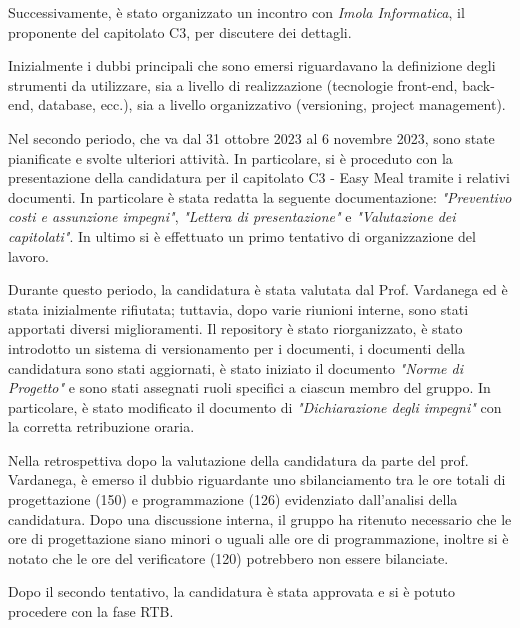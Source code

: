 Successivamente, è stato organizzato un incontro con \emph{Imola Informatica}, il proponente del capitolato C3, per discutere dei dettagli.

Inizialmente i dubbi principali che sono emersi riguardavano la definizione degli strumenti da utilizzare, sia a livello di realizzazione (tecnologie front-end, back-end, database, ecc.), sia a livello organizzativo (versioning, project management).

Nel secondo periodo, che va dal 31 ottobre 2023 al 6 novembre 2023, sono state pianificate e svolte ulteriori attività. In particolare, si è proceduto con la presentazione della candidatura per il capitolato C3 - Easy Meal tramite i relativi documenti. In particolare è stata redatta la seguente documentazione: \emph{"Preventivo costi e assunzione impegni"}, \emph{"Lettera di presentazione"} e \emph{"Valutazione dei capitolati"}. In ultimo si è effettuato un primo tentativo di organizzazione del lavoro.

Durante questo periodo, la candidatura è stata valutata dal Prof. Vardanega ed è stata inizialmente rifiutata; tuttavia, dopo varie riunioni interne, sono stati apportati diversi miglioramenti. Il repository è stato riorganizzato, è stato introdotto un sistema di versionamento per i documenti, i documenti della candidatura sono stati aggiornati, è stato iniziato il documento \emph{"Norme di Progetto"} e sono stati assegnati ruoli specifici a ciascun membro del gruppo. In particolare, è stato modificato il documento di \emph{"Dichiarazione degli impegni"} con la corretta retribuzione oraria.

Nella retrospettiva dopo la valutazione della candidatura da parte del prof. Vardanega, è emerso il dubbio riguardante uno sbilanciamento tra le ore totali di progettazione (150) e programmazione (126) evidenziato dall'analisi della candidatura. Dopo una discussione interna, il gruppo ha ritenuto necessario che le ore di progettazione siano minori o uguali alle ore di programmazione, inoltre si è notato che le ore del verificatore (120) potrebbero non essere bilanciate.

Dopo il secondo tentativo, la candidatura è stata approvata e si è potuto procedere con la fase RTB. 
